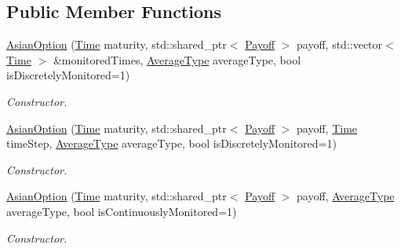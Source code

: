 \subsection*{Public Member Functions}
\begin{DoxyCompactItemize}
\item 
\hyperlink{class_asian_option_aa4020dfa8edd8d1e8f2756b633b3828b}{Asian\+Option} (\hyperlink{_name_def_8h_ac2d3e0ba793497bcca555c7c2cf64ff3}{Time} maturity, std\+::shared\+\_\+ptr$<$ \hyperlink{class_payoff}{Payoff} $>$ payoff, std\+::vector$<$ \hyperlink{_name_def_8h_ac2d3e0ba793497bcca555c7c2cf64ff3}{Time} $>$ \&monitored\+Times, \hyperlink{class_asian_option_add7292791bf85820ff9fdbfd4407f3b9}{Average\+Type} average\+Type, bool is\+Discretely\+Monitored=1)
\begin{DoxyCompactList}\small\item\em Constructor. \end{DoxyCompactList}\item 
\hyperlink{class_asian_option_a055f90a9d85eac93bac28cc9901489af}{Asian\+Option} (\hyperlink{_name_def_8h_ac2d3e0ba793497bcca555c7c2cf64ff3}{Time} maturity, std\+::shared\+\_\+ptr$<$ \hyperlink{class_payoff}{Payoff} $>$ payoff, \hyperlink{_name_def_8h_ac2d3e0ba793497bcca555c7c2cf64ff3}{Time} time\+Step, \hyperlink{class_asian_option_add7292791bf85820ff9fdbfd4407f3b9}{Average\+Type} average\+Type, bool is\+Discretely\+Monitored=1)
\begin{DoxyCompactList}\small\item\em Constructor. \end{DoxyCompactList}\item 
\hyperlink{class_asian_option_af6dc588a9183209493caf9eb7eb5e572}{Asian\+Option} (\hyperlink{_name_def_8h_ac2d3e0ba793497bcca555c7c2cf64ff3}{Time} maturity, std\+::shared\+\_\+ptr$<$ \hyperlink{class_payoff}{Payoff} $>$ payoff, \hyperlink{class_asian_option_add7292791bf85820ff9fdbfd4407f3b9}{Average\+Type} average\+Type, bool is\+Continuously\+Monitored=1)
\begin{DoxyCompactList}\small\item\em Constructor. \end{DoxyCompactList}\end{DoxyCompactItemize}
